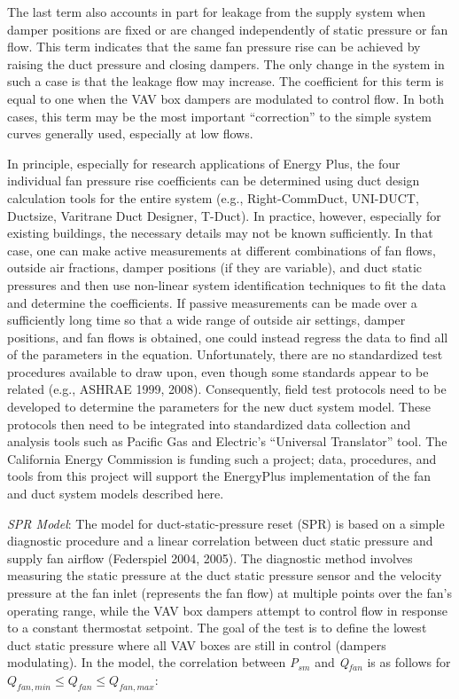 The last term also accounts in part for leakage from the supply system when damper positions are fixed or are changed independently of static pressure or fan flow. This term indicates that the same fan pressure rise can be achieved by raising the duct pressure and closing dampers. The only change in the system in such a case is that the leakage flow may increase. The coefficient for this term is equal to one when the VAV box dampers are modulated to control flow. In both cases, this term may be the most important ``correction'' to the simple system curves generally used, especially at low flows.

In principle, especially for research applications of Energy Plus, the four individual fan pressure rise coefficients can be determined using duct design calculation tools for the entire system (e.g., Right-CommDuct, UNI-DUCT, Ductsize, Varitrane Duct Designer, T-Duct). In practice, however, especially for existing buildings, the necessary details may not be known sufficiently. In that case, one can make active measurements at different combinations of fan flows, outside air fractions, damper positions (if they are variable), and duct static pressures and then use non-linear system identification techniques to fit the data and determine the coefficients. If passive measurements can be made over a sufficiently long time so that a wide range of outside air settings, damper positions, and fan flows is obtained, one could instead regress the data to find all of the parameters in the equation. Unfortunately, there are no standardized test procedures available to draw upon, even though some standards appear to be related (e.g., ASHRAE 1999, 2008). Consequently, field test protocols need to be developed to determine the parameters for the new duct system model. These protocols then need to be integrated into standardized data collection and analysis tools such as Pacific Gas and Electric's ``Universal Translator'' tool. The California Energy Commission is funding such a project; data, procedures, and tools from this project will support the EnergyPlus implementation of the fan and duct system models described here.

\emph{SPR Model}: The model for duct-static-pressure reset (SPR) is based on a simple diagnostic procedure and a linear correlation between duct static pressure and supply fan airflow (Federspiel 2004, 2005). The diagnostic method involves measuring the static pressure at the duct static pressure sensor and the velocity pressure at the fan inlet (represents the fan flow) at multiple points over the fan's operating range, while the VAV box dampers attempt to control flow in response to a constant thermostat setpoint. The goal of the test is to define the lowest duct static pressure where all VAV boxes are still in control (dampers modulating). In the model, the correlation between \emph{P\(_{sm}\)} and \emph{Q\(_{fan}\)} is as follows for \({Q_{fan,min}} \leq {Q_{fan}} \leq {Q_{fan,max}}\):

